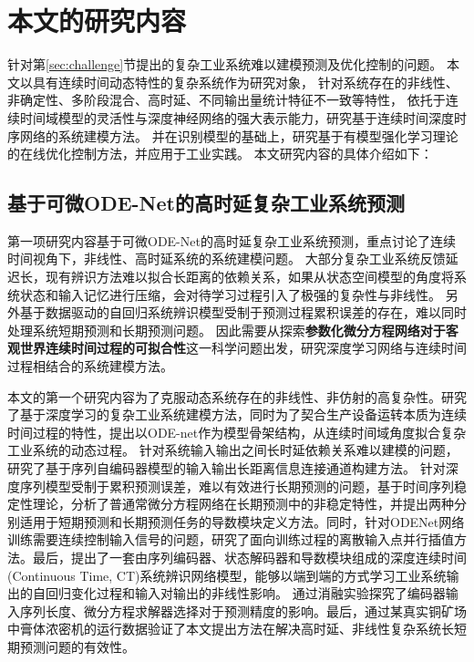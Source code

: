 \section{本文的研究内容}
针对第\ref{sec:challenge}节提出的复杂工业系统难以建模预测及优化控制的问题。
本文以具有连续时间动态特性的复杂系统作为研究对象，
针对系统存在的非线性、非确定性、多阶段混合、高时延、不同输出量统计特征不一致等特性，
依托于连续时间域模型的灵活性与深度神经网络的强大表示能力，研究基于连续时间深度时序网络的系统建模方法。
并在识别模型的基础上，研究基于有模型强化学习理论的在线优化控制方法，并应用于工业实践。
本文研究内容的具体介绍如下：

\subsection{基于可微ODE-Net的高时延复杂工业系统预测}
第一项研究内容基于可微ODE-Net的高时延复杂工业系统预测，重点讨论了连续时间视角下，非线性、高时延系统的系统建模问题。
大部分复杂工业系统反馈延迟长，现有辨识方法难以拟合长距离的依赖关系，如果从状态空间模型的角度将系统状态和输入记忆进行压缩，会对待学习过程引入了极强的复杂性与非线性。
另外基于数据驱动的自回归系统辨识模型受制于预测过程累积误差的存在，难以同时处理系统短期预测和长期预测问题。
因此需要从探索\textbf{参数化微分方程网络对于客观世界连续时间过程的可拟合性}这一科学问题出发，研究深度学习网络与连续时间过程相结合的系统建模方法。

本文的第一个研究内容为了克服动态系统存在的非线性、非仿射的高复杂性。研究了基于深度学习的复杂工业系统建模方法，同时为了契合生产设备运转本质为连续时间过程的特性，提出以ODE-net作为模型骨架结构，从连续时间域角度拟合复杂工业系统的动态过程。
针对系统输入输出之间长时延依赖关系难以建模的问题，研究了基于序列自编码器模型的输入输出长距离信息连接通道构建方法。
针对深度序列模型受制于累积预测误差，难以有效进行长期预测的问题，基于时间序列稳定性理论，分析了普通常微分方程网络在长期预测中的非稳定特性，并提出两种分别适用于短期预测和长期预测任务的导数模块定义方法。同时，针对ODENet网络训练需要连续控制输入信号的问题，研究了面向训练过程的离散输入点并行插值方法。最后，提出了一套由序列编码器、状态解码器和导数模块组成的深度连续时间(Continuous Time, CT)系统辨识网络模型，能够以端到端的方式学习工业系统输出的自回归变化过程和输入对输出的非线性影响。
通过消融实验探究了编码器输入序列长度、微分方程求解器选择对于预测精度的影响。最后，通过某真实铜矿场中膏体浓密机的运行数据验证了本文提出方法在解决高时延、非线性复杂系统长短期预测问题的有效性。


